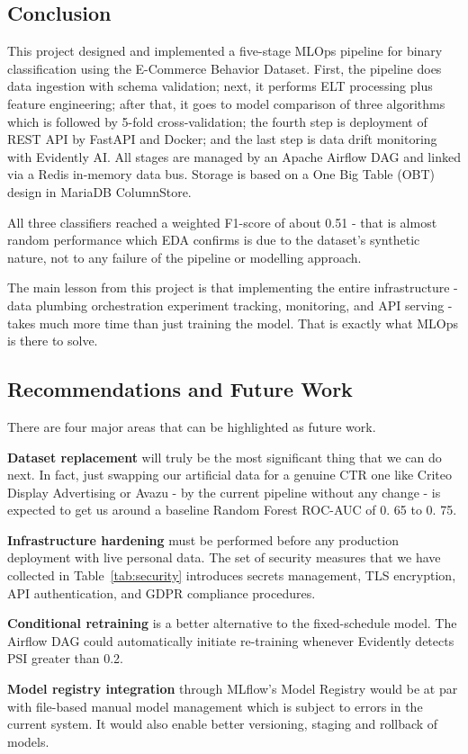 \documentclass[12pt,a4paper]{article}
\begin{document}
\subsection{Conclusion}

This project designed and implemented a five-stage MLOps pipeline for binary classification using the E-Commerce Behavior Dataset. First, the pipeline does data ingestion with schema validation; next, it performs ELT processing plus feature engineering; after that, it goes to model comparison of three algorithms which is followed by 5-fold cross-validation; the fourth step is deployment of REST API by FastAPI and Docker; and the last step is data drift monitoring with Evidently AI.  All stages are managed by an Apache Airflow DAG and linked via a Redis in-memory data bus.
Storage is based on a One Big Table (OBT) design in MariaDB ColumnStore.

All three classifiers reached a weighted F1-score of about 0.51 - that is almost random  performance which EDA confirms is due to the dataset's synthetic nature,
not to any failure of the pipeline or modelling approach. 

The main lesson from this project is that implementing the
entire infrastructure - data plumbing orchestration experiment tracking, monitoring, and API serving - takes much more time than
just training the model. That is exactly what MLOps is there to solve.

\subsection{Recommendations and Future Work}

There are four major areas that can be highlighted as future work.

\textbf{Dataset replacement} will truly be the most significant thing that we can do next. In fact, just swapping our artificial data for a genuine CTR one like Criteo
Display Advertising or Avazu - by the current pipeline without any change - is expected to get us around a baseline Random Forest \cite{he2014} ROC-AUC of 0. 65 to 0. 75.

\textbf{Infrastructure hardening} must be performed before any production deployment with live personal data. The set of security measures that we have collected in Table~\ref{tab:security}
introduces secrets management, TLS encryption, API authentication, and GDPR compliance procedures.

\textbf{Conditional retraining} is a better alternative to the fixed-schedule model. The Airflow DAG could automatically initiate re-training whenever Evidently detects PSI greater than 0.2.

\textbf{Model registry integration} through MLflow's Model Registry would be at par with file-based manual model management which is subject to errors in the current system. It
would also enable better versioning, staging and rollback of models.



\newpage
{}


\end{document}
